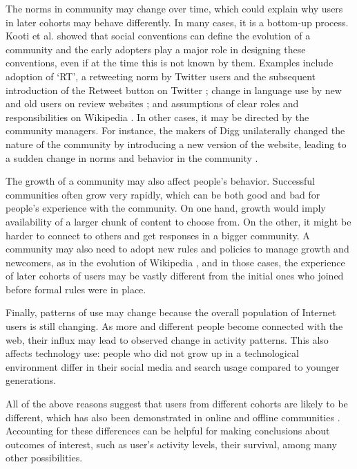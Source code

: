 The norms in community may change over time, which could explain why users in later cohorts may behave differently. In many cases, it is a bottom-up process. Kooti et al. \cite{Kooti2010} showed that social conventions can define the evolution of a community and the early adopters play a major role in designing these conventions, even if at the time this is not known by them. Examples include adoption of `RT', a retweeting norm by Twitter users and the subsequent introduction of the Retweet button on Twitter \cite{Kooti2010}; change in language use by new and old users on review websites \cite{Danescu-niculescu-mizil2013}; and assumptions of clear roles and responsibilities on Wikipedia \cite{Kittur2007a}. In other cases, it may be directed by the community managers. For instance, the makers of Digg unilaterally changed the nature of the community by introducing a new version of the website, leading to a sudden change in norms and behavior in the community \cite{Ingram2014,Lardinois2014}. 

The growth of a community may also affect people's behavior. Successful communities often grow very rapidly, which can be both good and bad for people's experience with the community. On one hand, growth would imply availability of a larger chunk of content to choose from. On the other, it might be harder to connect to others and get responses in a bigger community. A community may also need to adopt new rules and policies to manage growth and newcomers, as in the evolution of Wikipedia \cite{Choi2010,Bryant2005}, and in those cases, the experience of later cohorts of users may be vastly different from the initial ones who joined before formal rules were in place. 

Finally, patterns of use may change because the overall population of Internet users is still changing. As more and different people become connected with the web, their influx may lead to observed change in activity patterns.  This also affects technology use: people who did not grow up in a technological environment differ in their social media and search usage compared to younger generations\cite{Correa2010,Beldona2005}. 

All of the above reasons suggest that users from different cohorts are likely to be different, which has also been demonstrated in online and offline communities \cite{Ryder1965,Danescu-niculescu-mizil2013,Prensky2001,Correa2010}. Accounting for these differences can be helpful for making conclusions about outcomes of interest, such as user's activity levels, their survival, among many other possibilities.




